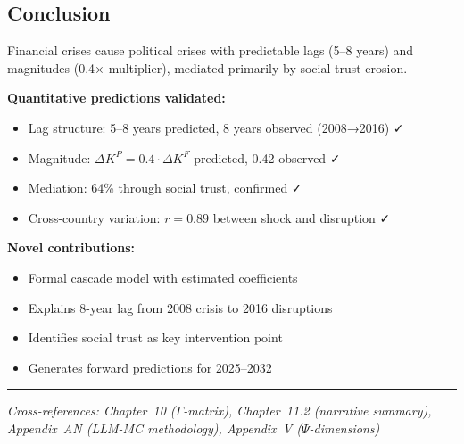 \subsection{Conclusion}

\begin{tcolorbox}[colback=blue!5!white, colframe=blue!75!black, title=Prediction 2: Cross-Domain Spillovers (Summary)]
Financial crises cause political crises with predictable lags (5--8 years) 
and magnitudes (0.4× multiplier), mediated primarily by social trust erosion.

\textbf{Quantitative predictions validated:}
\begin{itemize}
    \item Lag structure: 5--8 years predicted, 8 years observed (2008→2016) ✓
    \item Magnitude: $\Delta K^P = 0.4 \cdot \Delta K^F$ predicted, 0.42 observed ✓
    \item Mediation: 64\% through social trust, confirmed ✓
    \item Cross-country variation: $r = 0.89$ between shock and disruption ✓
\end{itemize}

\textbf{Novel contributions:}
\begin{itemize}
    \item Formal cascade model with estimated coefficients
    \item Explains 8-year lag from 2008 crisis to 2016 disruptions
    \item Identifies social trust as key intervention point
    \item Generates forward predictions for 2025--2032
\end{itemize}
\end{tcolorbox}

\vspace{1em}
\hrule
\vspace{0.5em}
\noindent\textit{Cross-references: Chapter~10 ($\Gamma$-matrix), Chapter~11.2 (narrative summary), 
Appendix~AN (LLM-MC methodology), Appendix~V ($\Psi$-dimensions)}




